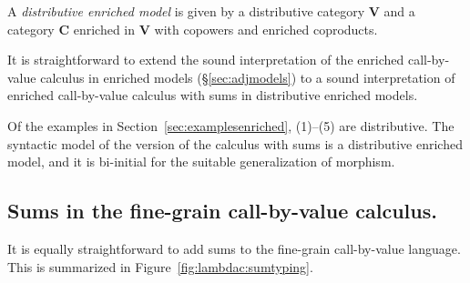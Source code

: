 \documentclass{LMCS}
\newcommand{\VCat}{\fixedcatfont{V}} \newcommand{\CCat}{\fixedcatfont{C}} \newcommand{\DCat}{\fixedcatfont{D}}
\newcommand{\fixedcatfont}{\mathbf}
\begin{document}
\begin{defi}\label{def:distrenrichedmodel}
A \emph{distributive enriched model}
is given by a distributive category $\VCat$ 
and a category $\CCat$ enriched in $\VCat$ with copowers and 
enriched coproducts.
\end{defi}
It is straightforward to extend the sound interpretation
of the enriched call-by-value calculus in enriched models
(\S\ref{sec:adjmodels})
to a sound interpretation of 
enriched call-by-value calculus with sums in distributive enriched models.

Of the examples in Section~\ref{sec:examplesenriched},
(1)--(5) are distributive.
The syntactic model of the version of the calculus with sums is 
a distributive enriched model, and it is bi-initial for the suitable 
generalization of morphism.
\subsection{Sums in the fine-grain call-by-value calculus.}
\label{sec:sums:fgcbv}
It is equally straightforward to add sums to the fine-grain call-by-value
language. This is summarized in Figure~\ref{fig:lambdac:sumtyping}.
\end{document}
